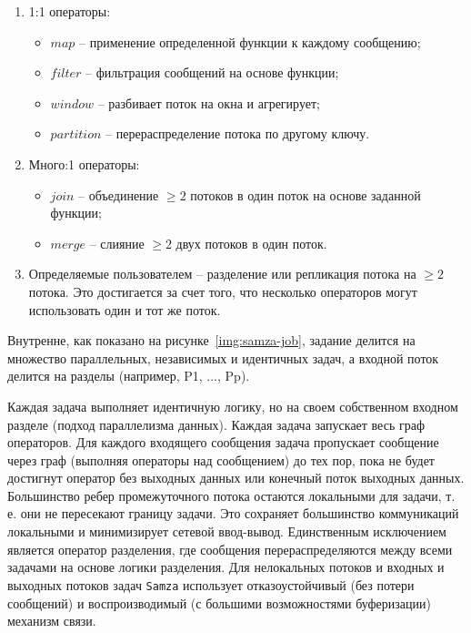 \begin{enumerate}
  \item 1:1 операторы:
    \begin{itemize}
      \item $map$ -- применение определенной функции к каждому сообщению; 
      \item $filter$ -- фильтрация сообщений на основе функции;
      \item $window$ -- разбивает поток на окна и агрегирует;
      \item $partition$ -- перераспределение потока по другому ключу.
    \end{itemize}
  \item Много:1 операторы:
    \begin{itemize}
      \item $join$ -- объединение $\geq 2$ потоков в один поток на основе заданной функции;
      \item $merge$ -- слияние $\geq 2$ двух потоков в один поток.
    \end{itemize}
    \clearpage
  \item Определяемые пользователем -- разделение или репликация потока на $\geq 2$ потока. Это достигается за счет того, что несколько операторов могут использовать один и тот же поток.
\end{enumerate}

Внутренне, как показано на рисунке~\ref{img:samza-job}, задание делится на множество параллельных, независимых и идентичных задач, а входной поток делится на разделы (например, {P1, ..., Pp}). 

Каждая задача выполняет идентичную логику, но на своем собственном входном разделе (подход параллелизма данных). 
Каждая задача запускает весь граф операторов. 
Для каждого входящего сообщения задача пропускает сообщение через граф (выполняя операторы над сообщением) до тех пор, пока не будет достигнут оператор без выходных данных или конечный поток выходных данных. 
Большинство ребер промежуточного потока остаются локальными для задачи, т. е. они не пересекают границу задачи. 
Это сохраняет большинство коммуникаций локальными и минимизирует сетевой ввод-вывод. 
Единственным исключением является оператор разделения, где сообщения перераспределяются между всеми задачами на основе логики разделения. 
Для нелокальных потоков и входных и выходных потоков задач \texttt{Samza} использует отказоустойчивый (без потери сообщений) и воспроизводимый (с большими возможностями буферизации) механизм связи.

